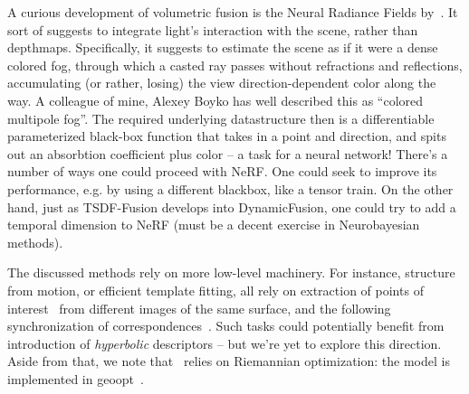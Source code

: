 A curious development of volumetric fusion is the Neural Radiance Fields
by~\citet{nerf}. It sort of suggests to integrate light's interaction with the
scene, rather than depthmaps.  Specifically, it suggests to estimate the scene
as if it were a dense colored fog, through which a casted ray passes without
refractions and reflections, accumulating (or rather, losing) the view
direction-dependent color along the way. A colleague of mine, Alexey Boyko has
well described this as ``colored multipole fog''. The required underlying
datastructure then is a differentiable parameterized black-box function that
takes in a point and direction, and spits out an absorbtion coefficient plus
color -- a task for a neural network!
There's a number of ways one could proceed with NeRF. One could seek to improve
its performance, e.g. by using a different blackbox, like a tensor train.  On
the other hand, just as TSDF-Fusion develops into DynamicFusion, one could try
to add a temporal dimension to NeRF (must be a decent exercise in Neurobayesian
methods).

The discussed methods rely on more low-level machinery. For instance,
structure from motion, or efficient template fitting, all rely on extraction of
points of interest~\cite{r2d2} from different images of the same surface, and
the following synchronization of correspondences~\cite{birdalCorrespondences}.
Such tasks could potentially benefit from introduction of \emph{hyperbolic}
descriptors -- but we're yet to explore this direction. Aside from that, we
note that~\citet{birdalCorrespondences} relies on Riemannian optimization:
the model is implemented in geoopt~\cite{geoopt}.

